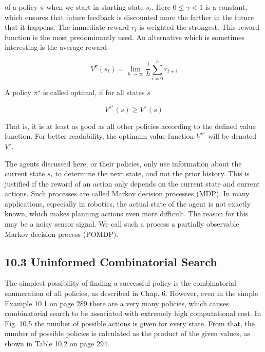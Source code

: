 \documentclass[10pt]{article}
\begin{document}
of a policy $\pi$ when we start in starting state $s_{t}$. Here $0 \leq \gamma<1$ is a constant, which ensures that future feedback is discounted more the farther in the future that it happens. The immediate reward $r_{t}$ is weighted the strongest. This reward function is the most predominantly used. An alternative which is sometimes interesting is the average reward


\begin{equation*}
V^{\pi}\left(s_{t}\right)=\lim _{h \rightarrow \infty} \frac{1}{h} \sum_{i=0}^{h} r_{t+i} \tag{10.2}
\end{equation*}


A policy $\pi^{\star}$ is called optimal, if for all states $s$


\begin{equation*}
V^{\pi^{\star}}(s) \geq V^{\pi}(s) \tag{10.3}
\end{equation*}


That is, it is at least as good as all other policies according to the defined value function. For better readability, the optimum value function $V^{\pi^{\star}}$ will be denoted $V^{\star}$.

The agents discussed here, or their policies, only use information about the current state $s_{t}$ to determine the next state, and not the prior history. This is justified if the reward of an action only depends on the current state and current actions. Such processes are called Markov decision processes (MDP). In many applications, especially in robotics, the actual state of the agent is not exactly known, which makes planning actions even more difficult. The reason for this may be a noisy sensor signal. We call such a process a partially observable Markov decision process (POMDP).

\subsection*{10.3 Uninformed Combinatorial Search}
The simplest possibility of finding a successful policy is the combinatorial enumeration of all policies, as described in Chap. 6. However, even in the simple Example 10.1 on page 289 there are a very many policies, which causes combinatorial search to be associated with extremely high computational cost. In Fig. 10.5 the number of possible actions is given for every state. From that, the number of possible policies is calculated as the product of the given values, as shown in Table 10.2 on page 294.
\end{document}
